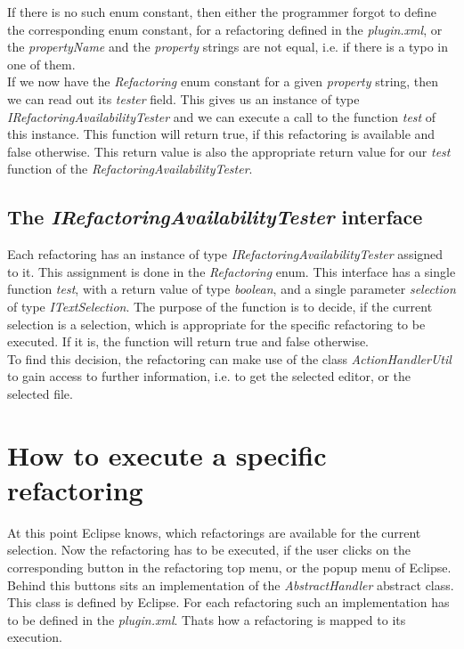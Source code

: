 \documentclass[a4paper,10pt]{report}
\begin{document}
If there is no such enum constant, then either the programmer forgot to define the corresponding enum constant, for a refactoring defined in the {\it plugin.xml}, or the {\it propertyName} and the {\it property} strings are not equal, i.e. if there is a typo in one of them.\\
If we now have the {\it Refactoring} enum constant for a given {\it property} string, then we can read out its {\it tester} field. This gives us an instance of type {\it IRefactoringAvailabilityTester} and we can execute a call to the function {\it test} of this instance.
This function will return true, if this refactoring is available and false otherwise. This return value is also the appropriate return value for our {\it test} function of the {\it RefactoringAvailabilityTester}.

\subsection{The {\it IRefactoringAvailabilityTester} interface}
Each refactoring has an instance of type {\it IRefactoringAvailabilityTester} assigned to it. This assignment is done in the {\it Refactoring} enum. This interface has a single function {\it test}, with a return value of type {\it boolean}, and a single parameter {\it selection} of type {\it ITextSelection}.
The purpose of the function is to decide, if the current selection is a selection, which is appropriate for the specific refactoring to be executed. If it is, the function will return true and false otherwise.\\
To find this decision, the refactoring can make use of the class {\it ActionHandlerUtil} to gain access to further information, i.e. to get the selected editor, or the selected file.

\section{How to execute a specific refactoring}
At this point Eclipse knows, which refactorings are available for the current selection. Now the refactoring has to be executed, if the user clicks on the corresponding button in the refactoring top menu, or the popup menu of Eclipse.
Behind this buttons sits an implementation of the {\it AbstractHandler} abstract class. This class is defined by Eclipse. For each refactoring such an implementation has to be defined in the {\it plugin.xml}. Thats how a refactoring is mapped to its execution.
\end{document}
